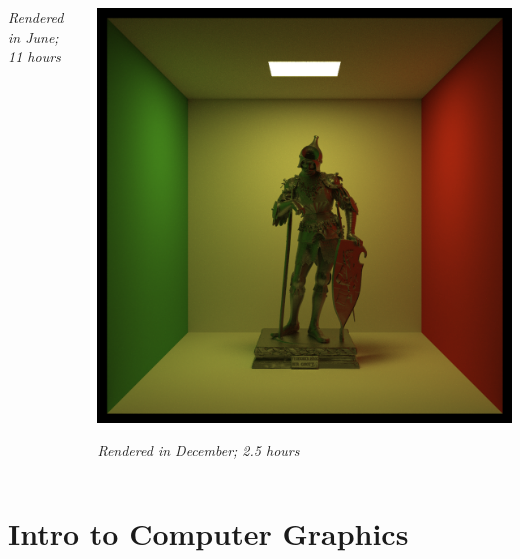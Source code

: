 \documentclass{beamer}
\begin{document}
\begin{frame}
\begin{columns}[T]
\begin{column}{0.5\textwidth}
			\textit{Rendered in June; 11 hours}
		\end{column}
		\begin{column}{0.5\textwidth}
			\centering
			\includegraphics[width=\textwidth]{media/statue.png}

			\textit{Rendered in December; 2.5 hours}
		\end{column}
	\end{columns}
\end{frame}

\section{Intro to Computer Graphics}
\end{document}
